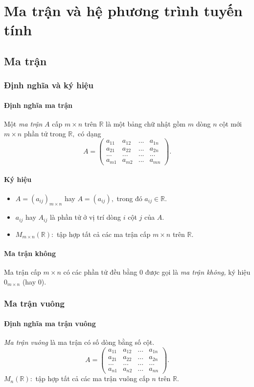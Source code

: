 \chapter{Ma trận và hệ phương trình tuyến tính}
\section{Ma trận}
\subsection{Định nghĩa và ký hiệu}
\subsubsection{Định nghĩa ma trận}
Một \textit{ma trận} $A$ cấp $m \times n$ trên $\mathbb{R}$ là một bảng chữ nhật gồm $m$ dòng $n$ cột mới $m \times n$ phần tử trong $\mathbb{R},$ có dạng
$$A = \left( {\begin{array}{*{20}{c}}
  {{a_{11}}}&{{a_{12}}}&{...}&{{a_{1n}}} \\ 
  {{a_{21}}}&{{a_{22}}}&{...}&{{a_{2n}}} \\ 
  {...}&{...}&{...}&{...} \\ 
  {{a_{m1}}}&{{a_{m2}}}&{...}&{{a_{mn}}} 
\end{array}} \right).$$
\subsubsection{Ký hiệu}
\begin{itemize}
\item $A = {\left( {{a_{ij}}} \right)_{m \times n}}$ hay $A = \left( {{a_{ij}}} \right),$ trong đó $a_{ij} \in \mathbb{R}.$ 
\item $a_{ij}$ hay $A_{ij}$ là phần tử ở vị trí dòng $i$ cột $j$ của $A.$
\item ${M_{m \times n}}\left( {\mathbb{R}} \right):$ tập hợp tất cả các ma trận cấp $m \times n$ trên $\mathbb{R}.$
\end{itemize}
\subsubsection{Ma trận không}
Ma trận cấp $m \times n$ có các phần tử đều bằng $0$ được gọi là \textit{ma trận không,} ký hiệu $0_{m \times n}$ (hay $0$).
\subsection{Ma trận vuông}
\subsubsection{Định nghĩa ma trận vuông}
\textit{Ma trận vuông} là ma trận có số dòng bằng số cột.
$$A = \left( {\begin{array}{*{20}{c}}
  {{a_{11}}}&{{a_{12}}}&{...}&{{a_{1n}}} \\ 
  {{a_{21}}}&{{a_{22}}}&{...}&{{a_{2n}}} \\ 
  {...}&{...}&{...}&{...} \\ 
  {{a_{n1}}}&{{a_{n2}}}&{...}&{{a_{nn}}} 
\end{array}} \right).$$
$M_n \left( {\mathbb{R}} \right):$ tập hợp tất cả các ma trận vuông cấp $n$ trên $\mathbb{R}.$
